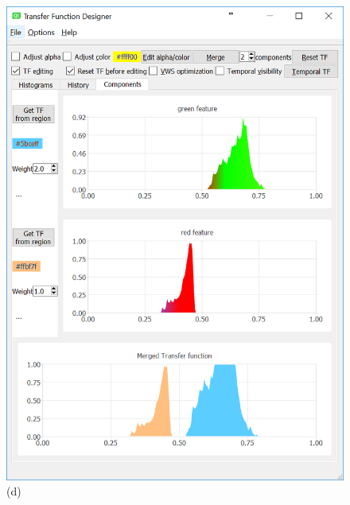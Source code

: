 \documentclass[twoside,twocolumn,10pt]{article}
\begin{document}
\begin{figure}
\begin{minipage}{.16\textwidth}
		\includegraphics[width=1\linewidth]{tf_vortex_merged_green_red}
		(d)
	\end{minipage}~
	\begin{minipage}{.16\textwidth}
		\centering

\end{minipage}
\end{figure}
\end{document}
